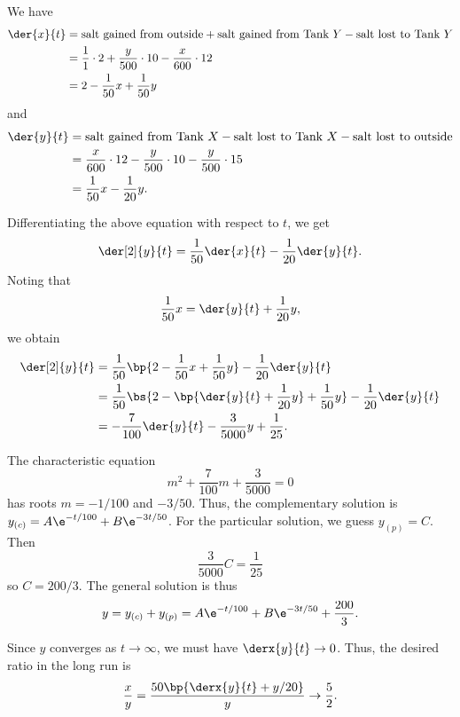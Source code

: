 \begin{solution}
    \begin{ppart}
        We have
        \begin{align*}
            \der{x}{t} &= \text{salt gained from outside} + \text{salt gained from Tank $Y$} - \text{salt lost to Tank $Y$}\\
            &= \frac11 \cdot 2 + \frac{y}{500} \cdot 10 - \frac{x}{600} \cdot 12\\
            &= 2 - \frac1{50} x + \frac1{50} y
        \end{align*}
        and
        \begin{align*}
            \der{y}{t} &= \text{salt gained from Tank $X$} - \text{salt lost to Tank $X$} - \text{salt lost to outside}\\
            &= \frac{x}{600} \cdot 12 - \frac{y}{500} \cdot 10 - \frac{y}{500} \cdot 15\\
            &= \frac1{50} x - \frac1{20} y.
        \end{align*}
    \end{ppart}
    \begin{ppart}
        Differentiating the above equation with respect to $t$, we get \[\der[2]{y}{t} = \frac1{50} \der{x}{t} - \frac1{20} \der{y}{t}.\] Noting that \[\frac1{50} x = \der{y}{t} + \frac1{20} y,\] we obtain
        \begin{align*}
            \der[2]{y}{t} &= \frac1{50} \bp{2 - \frac1{50} x + \frac1{50} y} - \frac1{20} \der{y}{t}\\
            &= \frac1{50} \bs{2 - \bp{\der{y}{t} + \frac1{20} y} + \frac1{50} y} - \frac1{20} \der{y}{t}\\
            &= -\frac7{100} \der{y}{t} - \frac3{5000} y + \frac1{25}.
        \end{align*}
    \end{ppart}
    \begin{ppart}
        The characteristic equation \[m^2 + \frac7{100} m + \frac3{5000} = 0\] has roots $m = -1/100$ and $-3/50$. Thus, the complementary solution is $y_{(c)} = A\e^{-t/100} + B\e^{-3t/50}$. For the particular solution, we guess $y_{(p)} = C$. Then \[\frac3{5000} C = \frac1{25}\] so $C = 200/3$. The general solution is thus \[y = y_{(c)} + y_{(p)} = A\e^{-t/100} + B\e^{-3t/50} + \frac{200}{3}.\]
    \end{ppart}
    \begin{ppart}
        Since $y$ converges as $t \to \infty$, we must have $\derx{y}{t} \to 0$. Thus, the desired ratio in the long run is \[\frac{x}{y} = \frac{50\bp{\derx{y}{t} + y/20}}{y} \to \frac52.\]
    \end{ppart}
\end{solution}